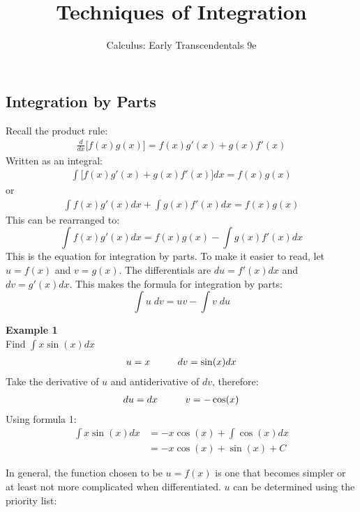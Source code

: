\documentclass[a4paper]{article}
\title{Techniques of Integration}
\author{Calculus: Early Transcendentals 9e}
\date{}
\let\bf\textbf
\newcommand\der[2]{\frac{d #1}{d #2}}
\begin{document}
\maketitle
\setcounter{section}{7}
\subsection{Integration by Parts}
Recall the product rule:
\begin{align*}
    \der{}{x}\big[f(x)g(x)\big] = f(x)g'(x) + g(x)f'(x)
\end{align*}
Written as an integral:
\begin{align*}
    \int\big[f(x)g'(x) + g(x)f'(x)\big]dx = f(x)g(x)
\end{align*}
or
\begin{align*}
    \int f(x)g'(x)dx + \int g(x)f'(x)dx = f(x)g(x)
\end{align*}
This can be rearranged to:
\begin{equation}
    \int f(x)g'(x)dx = f(x)g(x) - \int g(x)f'(x)dx
\end{equation}
This is the equation for integration by parts. To make it easier to read, let $u = f(x)$ and $v = g(x)$. The differentials are $du = f'(x)dx$ and $dv = g'(x)dx$. This makes the formula for integration by parts:
\begin{equation}
    \int u\;dv = uv - \int v\;du
\end{equation}
\begin{shaded}
    \noindent\bf{Example 1}
    \vspace{2mm}\\
    Find $\displaystyle\int x\sin(x)dx$
    \begin{align*}
        u = x \hspace{10mm} dv = \sin(x)dx
    \end{align*}
    Take the derivative of $u$ and antiderivative of $dv$, therefore:
    \begin{align*}
        du = dx \hspace{10mm} v = -\cos(x)
    \end{align*}
    Using formula 1:
    \begin{align*}
        \int x\sin(x)dx &= -x\cos(x) + \int \cos(x)dx\\
        &= -x\cos(x) + \sin(x) + C
    \end{align*}
\end{shaded}
\noindent In general, the function chosen to be $u = f(x)$ is one that becomes simpler or at least not more complicated when differentiated. $u$ can be determined using the priority list:
\end{document}
